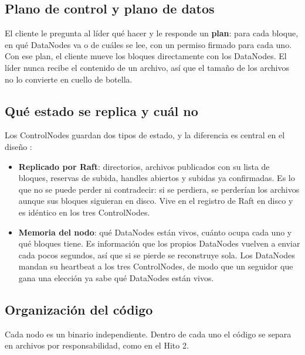 \documentclass[10pt]{article}
\begin{document}
\subsection{Plano de control y plano de datos}

El cliente le pregunta al líder qué hacer y le responde un \textbf{plan}: para cada bloque, en qué DataNodes va o de cuáles se lee, con un permiso firmado para cada uno. Con ese plan, el cliente mueve los bloques directamente con los DataNodes. El líder nunca recibe el contenido de un archivo, así que el tamaño de los archivos no lo convierte en cuello de botella.

\subsection{Qué estado se replica y cuál no}

Los ControlNodes guardan dos tipos de estado, y la diferencia es central en el diseño :

\begin{itemize}
\item \textbf{Replicado por Raft}: directorios, archivos publicados con su lista de bloques, reservas de subida, handles abiertos y subidas ya confirmadas. Es lo que no se puede perder ni contradecir: si se perdiera, se perderían los archivos aunque sus bloques siguieran en disco. Vive en el registro de Raft en disco y es idéntico en los tres ControlNodes.
\item \textbf{Memoria del nodo}: qué DataNodes están vivos, cuánto ocupa cada uno y qué bloques tiene. Es información que los propios DataNodes vuelven a enviar cada pocos segundos, así que si se pierde se reconstruye sola. Los DataNodes mandan su heartbeat a los tres ControlNodes, de modo que un seguidor que gana una elección ya sabe qué DataNodes están vivos.
\end{itemize}

\subsection{Organización del código}

Cada nodo es un binario independiente. Dentro de cada uno el código se separa en archivos por responsabilidad, como en el Hito 2.
\end{document}
